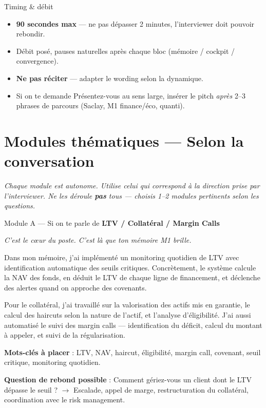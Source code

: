 \documentclass[11pt,a4paper]{article}
\begin{document}
\begin{warnbox}{Timing \& d\'ebit}
\begin{itemize}[nosep, leftmargin=12pt]
\item \textbf{90 secondes max} --- ne pas d\'epasser 2 minutes, l'interviewer doit pouvoir rebondir.
\item D\'ebit pos\'e, pauses naturelles apr\`es chaque bloc (m\'emoire / cockpit / convergence).
\item \textbf{Ne pas r\'eciter} --- adapter le wording selon la dynamique.
\item Si on te demande \og Pr\'esentez-vous \fg{} au sens large, ins\'erer le pitch \textit{apr\`es}
      2--3 phrases de parcours (Saclay, M1 finance/\'eco, quanti).
\end{itemize}
\end{warnbox}

\vspace{10pt}

\section{Modules th\'ematiques --- Selon la conversation}

\textcolor{warmgray}{\textit{Chaque module est autonome. Utilise celui qui correspond
\`a la direction prise par l'interviewer. Ne les d\'eroule \textbf{pas} tous --- choisis
1--2 modules pertinents selon les questions.}}

\vspace{8pt}

\begin{modulebox}{Module A --- Si on te parle de \textbf{LTV / Collat\'eral / Margin Calls}}

\textit{C'est le c\oe{}ur du poste. C'est l\`a que ton m\'emoire M1 brille.}

\begin{verbatimbox}
\og Dans mon m\'emoire, j'ai impl\'ement\'e un monitoring quotidien de LTV avec
identification automatique des seuils critiques. Concr\`etement, le syst\`eme
calcule la NAV des fonds, en d\'eduit le LTV de chaque ligne de financement,
et d\'eclenche des alertes quand on approche des covenants.

Pour le collat\'eral, j'ai travaill\'e sur la valorisation des actifs mis en
garantie, le calcul des haircuts selon la nature de l'actif, et l'analyse
d'\'eligibilit\'e. J'ai aussi automatis\'e le suivi des margin calls ---
identification du d\'eficit, calcul du montant \`a appeler, et suivi de la
r\'egularisation. \fg{}
\end{verbatimbox}

\textbf{Mots-cl\'es \`a placer} : LTV, NAV, haircut, \'eligibilit\'e, margin call,
covenant, seuil critique, monitoring quotidien.

\textbf{Question de rebond possible} : \og Comment g\'eriez-vous un client dont le
LTV d\'epasse le seuil ? \fg{} $\rightarrow$ Escalade, appel de marge,
restructuration du collat\'eral, coordination avec le risk management.
\end{modulebox}
\end{document}
